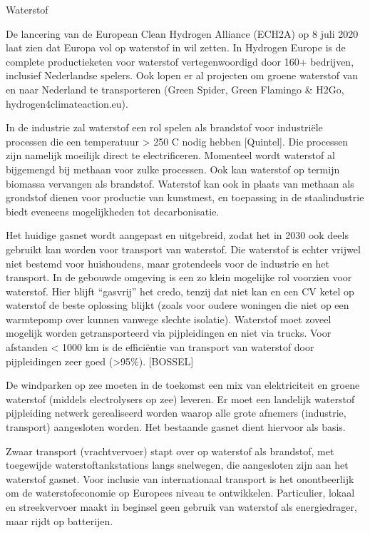 \begin{voorstel}{Waterstof}
\begin{multicols*}{2}
\begin{overwegingen}
De lancering van de European Clean Hydrogen Alliance (ECH2A) op 8 juli 2020 laat zien dat Europa vol op waterstof in wil zetten. In Hydrogen Europe is de complete productieketen voor waterstof vertegenwoordigd door 160+ bedrijven, inclusief Nederlandse spelers. Ook lopen er al projecten om groene waterstof van en naar Nederland te transporteren (Green Spider, Green Flamingo \& H2Go, hydrogen4climateaction.eu).

In de industrie zal waterstof een rol spelen als brandstof voor industriële processen die een temperatuur > 250 C nodig hebben [Quintel]. Die processen zijn namelijk moeilijk direct te electrificeren. Momenteel wordt waterstof al bijgemengd bij methaan voor zulke processen. Ook kan waterstof op termijn biomassa vervangen als brandstof. Waterstof kan ook in plaats van methaan als grondstof dienen voor productie van kunstmest, en toepassing in de staalindustrie biedt eveneens mogelijkheden tot decarbonisatie.

Het huidige gasnet wordt aangepast en uitgebreid, zodat het in 2030 ook deels gebruikt kan worden voor transport van waterstof. Die waterstof is echter vrijwel niet bestemd voor huishoudens, maar grotendeels voor de industrie en het transport. In de gebouwde omgeving is een zo klein mogelijke rol voorzien voor waterstof. Hier blijft “gasvrij” het credo, tenzij dat niet kan en een CV ketel op waterstof de beste oplossing blijkt (zoals voor oudere woningen die niet op een warmtepomp over kunnen vanwege slechte isolatie). Waterstof moet zoveel mogelijk worden getransporteerd via pijpleidingen en niet via trucks. Voor afstanden < 1000 km is de efficiëntie van transport van waterstof door pijpleidingen zeer goed (>95\%). [BOSSEL]

\end{overwegingen}

\begin{aanbevelingen}
De windparken op zee moeten in de toekomst een mix van elektriciteit en groene waterstof (middels electrolysers op zee) leveren.
Er moet een landelijk waterstof pijpleiding netwerk gerealiseerd worden waarop alle grote afnemers (industrie, transport) aangesloten worden. Het bestaande gasnet dient hiervoor als basis.

Zwaar transport (vrachtvervoer) stapt over op waterstof als brandstof, met toegewijde waterstoftankstations langs snelwegen, die aangesloten zijn aan het waterstof gasnet. Voor inclusie van internationaal transport is het onontbeerlijk om de waterstofeconomie op Europees niveau te ontwikkelen. Particulier, lokaal en streekvervoer maakt in beginsel geen gebruik van waterstof als energiedrager, maar rijdt op batterijen.


\end{aanbevelingen}
\end{multicols*}
\end{voorstel}
